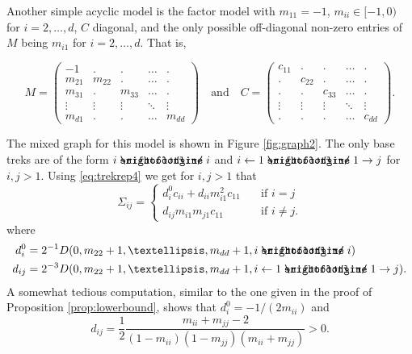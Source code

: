 \documentclass[10pt,twoside,a4paper]{amsart}
\DeclareRobustCommand{\unEdge}{%
	\mathrel{%
		\text{%
			\ooalign{$\rightfootline$\cr\reflectbox{$\rightfootline$}\cr}%
		}%
	}%
}
\begin{document}
\begin{ex} \label{ex:factor} Another simple 
    acyclic model is the factor model with $m_{11} = -1$, $m_{ii} \in [-1, 0)$ for 
    $i = 2, \ldots, d$, $C$ diagonal, and the only possible off-diagonal 
    non-zero entries of $M$ being $m_{i1}$ for $i = 2, \ldots, d$. That is, 
    {\small \[
    M = \left( \begin{array}{cccccc} 
        -1 & . & . & \ldots &  . \\
        m_{21} & m_{22} & . & \ldots & . \\
        m_{31} & . & m_{33} & \ldots & . \\
        \vdots & \vdots & \vdots & \ddots & \vdots \\
        m_{d1} & . & . & \ldots  & m_{dd}
    \end{array}\right) \quad \text{and} \quad
    C = \left( \begin{array}{cccccc} 
        c_{11} & . & . & \ldots & . \\
        . & c_{22} & . & \ldots & .\\
        . & . & c_{33} & \ldots  & . \\
        \vdots & \vdots & \vdots & \ddots & \vdots \\
        . & . & . & \ldots & c_{dd}
    \end{array}\right).
    \] \par}
    The mixed graph for this model is shown in Figure \ref{fig:graph2}.
    The only base treks are of the form $i \unEdge i$ and 
    $ i \leftarrow 1 \unEdge 1 \rightarrow j$ for $i, j > 1$. 
    Using \eqref{eq:trekrep4} we get for $i, j > 1$ that 
    \begin{equation} \label{eq:factor_off}
        \Sigma_{ij} = \left\{ 
            \begin{array}{ll} 
                d^0_i c_{ii} +  d_{ii} m_{i1}^2 c_{11} & \quad \text{if } i = j \\
                d_{ij} m_{i1}m_{j1} c_{11} & \quad \text{if } i \neq j.
            \end{array}
        \right.
    \end{equation}
    where 
    \begin{align*}
    d^0_{i} & = 2^{-1} D(0, m_{22} + 1, \ldots, m_{dd} + 1, i \unEdge i) \\
    d_{ij} & = 2^{-3} D(0, m_{22} + 1, \ldots, m_{dd} + 1, i \leftarrow 1 \unEdge 1 \rightarrow j).
    \end{align*}
A somewhat tedious computation, similar to the one given in the proof of Proposition \ref{prop:lowerbound},
shows that $d^0_{i} = - 1/(2m_{ii})$ and
    \begin{equation} \label{eq:dij}
        d_{ij} = \frac{1}{2} \frac{m_{ii} + m_{jj} - 2}{(1 - m_{ii})(1 - m_{jj})(m_{ii} + m_{jj})} > 0.    
    \end{equation}



\end{ex}
\end{document}
